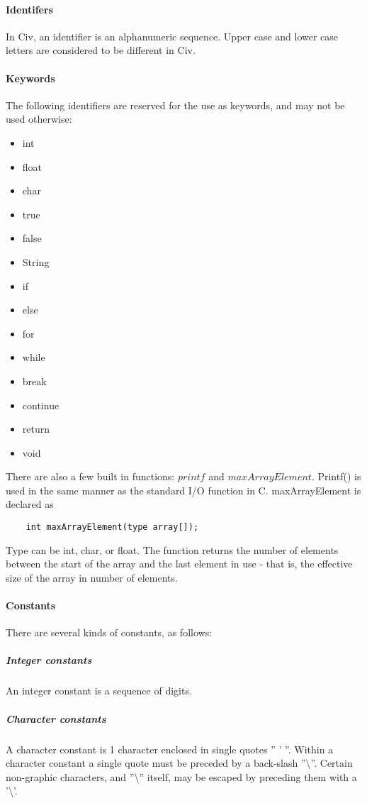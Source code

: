 \documentclass[a4paper]{article}
\begin{document}
\paragraph{Identifers}
In Civ, an identifier is an alphanumeric sequence. Upper case and lower case letters are considered to be different in Civ. 

\paragraph{Keywords}
The following identifiers are reserved for the use as keywords, and may not be used otherwise:
\begin{itemize}
\item int
\item float
\item char
\item true
\item false
\item String
\item if
\item else
\item for
\item while
\item break
\item continue
\item return
\item void
\end{itemize}
There are also a few built in functions: $printf$ and $maxArrayElement$. Printf() is used in the same manner as the standard I/O function in C.
maxArrayElement is declared as

\begin{verbatim}
    int maxArrayElement(type array[]);
\end{verbatim}

Type can be int, char, or float. The function returns the number of elements between the start of the array and the last element in use - that is, the effective size of the array in number of elements.

\paragraph{Constants}
There are several kinds of constants, as follows:

\subparagraph{Integer constants}
An integer constant is a sequence of digits.

\subparagraph{Character constants}
A character constant is 1 character enclosed in single quotes '' ' ''.  Within a character constant a single quote must be preceded by a back-slash ''\textbackslash''. Certain non-graphic characters, and ''\textbackslash'' itself, may be escaped by preceding them with a '\textbackslash'.
\end{document}
